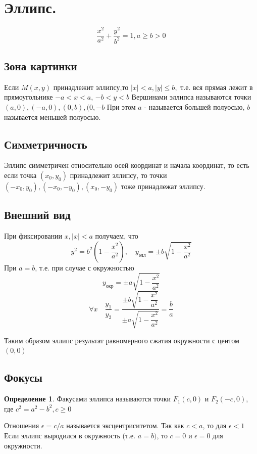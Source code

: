 \documentclass{article}
\theoremstyle{definition}
\newtheorem{definition}{Определение}
\begin{document}
\section{Эллипс.}

$$ \frac{x^2}{a^2} + \frac{y^2}{b ^2} = 1, a \geqslant b > 0 $$

\subsection{Зона картинки}

Если $M(x,y)$ принадлежит эллипсу,то $|x| < a, |y| \leqslant b,$ т.е. вся прямая лежит в прямоугольнике $-a < x < a$, $-b < y < b$
Вершинами эллипса называются точки $(a,0), (-a, 0), (0, b), (0, -b$ При этом $a$ - называется большей полуосью, $b$ называется меньшей полуосью.

\subsection{Симметричность}

Эллипс симметричен относительно осей координат и начала координат, то есть если точка $(x_0, y_0)$ принадлежит эллипсу, то точки $(-x_0, y_0), (-x_0, -y_0), (x_0, -y_0)$ тоже принадлежат эллипсу.

\subsection{Внешний вид}

При фиксировании $x, |x| < a$ получаем, что
$$y^2 = b^2 \left(1 - \frac{x^2}{a^2}\right),
\quad
y_{\textrm{элл}} = \pm b \sqrt{1 - \frac{x^2}{a^2}} $$
При $a = b$, т.е. при случае с окружностью
$$y_{\textrm{окр}} = \pm a \sqrt{1 - \frac{x^2}{a^2}} $$
$$\forall x\quad  \frac{y_1}{y_2} = \frac{\pm b \sqrt{1 - \dfrac{x^2}{a^2}}}{\pm a \sqrt{1 - \dfrac{x^2}{a^2}}} = \frac{b}{a}$$

Таким образом эллипс результат равномерного сжатия окружности с центом $(0, 0)$


\subsection{Фокусы}
\begin{definition}
 Факусами эллипса называются точки $F_1 (c, 0)$ и $F_2(-c, 0)$, где $c^2 = a^2 - b^2, c \geqslant 0$
\end{definition}

Отношения $\epsilon = c/a$ называется эксцентриситетом.
Так как $c < a$, то для $\epsilon < 1$
Если эллипс выродился в окружность (т.е. $a = b)$, то $c = 0$ и $\epsilon = 0$ для окружности.
\end{document}
